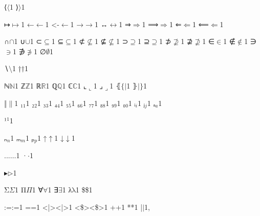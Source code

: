 {%
{⟨}{{\ensuremath{\langle}}}1
{⟩}{{\ensuremath{\rangle}}}1

{↦}{{\ensuremath{\mapsto}}}1
{←}{{\ensuremath{\leftarrow}}}1
{<-}{{\ensuremath{\leftarrow}}}1
{→}{{\ensuremath{\rightarrow}}}1
{↔}{{\ensuremath{\leftrightarrow}}}1
{⇒}{{\ensuremath{\Rightarrow}}}1
{⟹}{{\ensuremath{\Longrightarrow}}}1
{⇐}{{\ensuremath{\Leftarrow}}}1
{⟸}{{\ensuremath{\Longleftarrow}}}1

{∩}{{\ensuremath{\cap}}}1
{∪}{{\ensuremath{\cup}}}1
{⊂}{{\ensuremath{\subseteq}}}1
{⊆}{{\ensuremath{\subseteq}}}1
{⊄}{{\ensuremath{\nsubseteq}}}1
{⊈}{{\ensuremath{\nsubseteq}}}1
{⊃}{{\ensuremath{\supseteq}}}1
{⊇}{{\ensuremath{\supseteq}}}1
{⊅}{{\ensuremath{\nsupseteq}}}1
{⊉}{{\ensuremath{\nsupseteq}}}1
{∈}{{\ensuremath{\in}}}1
{∉}{{\ensuremath{\notin}}}1
{∋}{{\ensuremath{\ni}}}1
{∌}{{\ensuremath{\notni}}}1
{∅}{{\ensuremath{\emptyset}}}1

{∖}{{\ensuremath{\setminus}}}1
{†}{{\ensuremath{\dag}}}1

{ℕ}{{\ensuremath{\mathbb{N}}}}1
{ℤ}{{\ensuremath{\mathbb{Z}}}}1
{ℝ}{{\ensuremath{\mathbb{R}}}}1
{ℚ}{{\ensuremath{\mathbb{Q}}}}1
{ℂ}{{\ensuremath{\mathbb{C}}}}1
{⌞}{{\ensuremath{\llcorner}}}1
{⌟}{{\ensuremath{\lrcorner}}}1
{⦃}{{\ensuremath{\{\!|}}}1
{⦄}{{\ensuremath{|\!\}}}}1

{‖}{{\ensuremath{\|}}}1
{₁}{{\ensuremath{_1}}}1
{₂}{{\ensuremath{_2}}}1
{₃}{{\ensuremath{_3}}}1
{₄}{{\ensuremath{_4}}}1
{₅}{{\ensuremath{_5}}}1
{₆}{{\ensuremath{_6}}}1
{₇}{{\ensuremath{_7}}}1
{₈}{{\ensuremath{_8}}}1
{₉}{{\ensuremath{_9}}}1
{₀}{{\ensuremath{_0}}}1
{ᵢ}{{\ensuremath{_i}}}1
{ⱼ}{{\ensuremath{_j}}}1
{ₐ}{{\ensuremath{_a}}}1

{¹}{{\ensuremath{^1}}}1

{ₙ}{{\ensuremath{_n}}}1
{ₘ}{{\ensuremath{_m}}}1
{ₚ}{{\ensuremath{_p}}}1
{↑}{{\ensuremath{\uparrow}}}1
{↓}{{\ensuremath{\downarrow}}}1

{...}{{\ensuremath{\ldots}}}1
{·}{{\ensuremath{\cdot}}}1

{▸}{{\ensuremath{\triangleright}}}1

{Σ}{{\color{symbolcolor}\ensuremath{\Sigma}}}1
{Π}{{\color{symbolcolor}\ensuremath{\Pi}}}1
{∀}{{\color{symbolcolor}\ensuremath{\forall}}}1
{∃}{{\color{symbolcolor}\ensuremath{\exists}}}1
{λ}{{\color{symbolcolor}\ensuremath{\mathrm{\lambda}}}}1
{\$}{{\color{symbolcolor}\$}}1

{:=}{{\color{symbolcolor}:=}}1
{=}{{\color{symbolcolor}=}}1
{<|>}{{\color{symbolcolor}<|>}}1
{<\$>}{{\color{symbolcolor}<\$>}}1
{+}{{\color{symbolcolor}+}}1
{*}{{\color{symbolcolor}*}}1
{|}{\ensuremath{\mid}}1,

}
